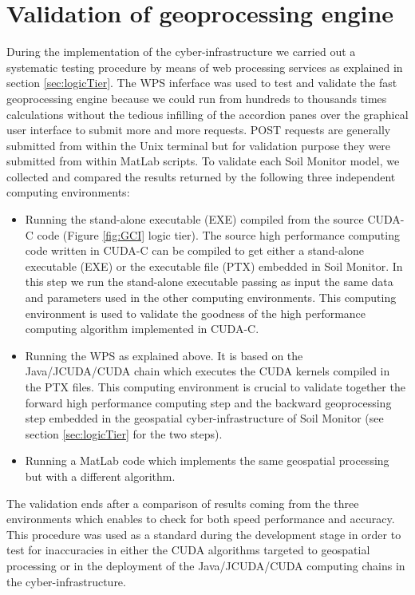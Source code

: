 \documentclass[APA,LATO1COL,doublespace]{WileyNJD-v2}
\begin{document}
\section{Validation of geoprocessing engine}\label{sec:validation}
During the implementation of the 
cyber-infrastructure we carried out a systematic testing procedure by means of web processing services as explained in section \ref{sec:logicTier}.
The WPS inferface was used to test and validate the fast geoprocessing engine because we could run from hundreds to thousands times calculations without the tedious infilling of the accordion panes over the graphical user interface to submit more and more requests.
POST requests are generally submitted from within the Unix terminal but for validation purpose they were submitted from within \mbox{MatLab\textregistered} scripts. %
To validate each Soil Monitor model, we collected and compared the results returned by the following three independent computing environments:
\begin{itemize}
    \item Running the stand-alone executable (EXE) compiled from the source CUDA-C code (Figure \ref{fig:GCI} logic tier).
    The source high performance computing code written in CUDA-C can be compiled to get either a stand-alone executable (EXE) or the executable file (PTX) embedded in Soil Monitor.
    In this step we run the stand-alone executable passing as input the same data and parameters used in the other computing environments.
    This computing environment is used to validate the goodness of the high performance computing algorithm implemented in CUDA-C.
    
    \item Running the WPS as explained above.
    It is based on the Java/JCUDA/CUDA chain which executes the CUDA kernels compiled in the PTX files. This computing environment is crucial to validate together the forward high performance computing step and the backward geoprocessing step embedded in the geospatial cyber-infrastructure of Soil Monitor (see section \ref{sec:logicTier} for the two steps). 
    
    \item Running a \mbox{MatLab\textregistered} code which implements the same geospatial processing but with a different algorithm.
\end{itemize}

The validation ends after a comparison of results coming from the three environments which enables to check for both speed performance and accuracy. 
This procedure was used as a standard during the development stage in order to test for inaccuracies in either the CUDA algorithms targeted to geospatial processing or in the deployment of the Java/JCUDA/CUDA computing chains in the cyber-infrastructure.
\end{document}
